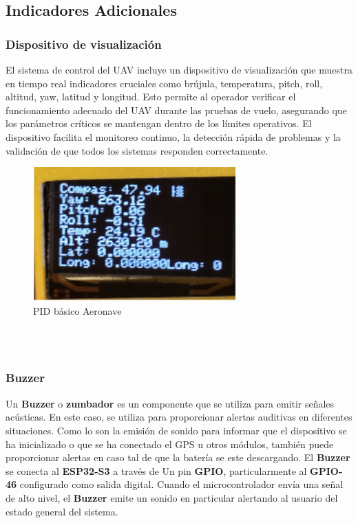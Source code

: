\subsection{Indicadores Adicionales}
\subsubsection{Dispositivo de visualización}
El sistema de control del UAV incluye un dispositivo de visualización que muestra en tiempo real indicadores cruciales como brújula, temperatura, pitch, roll, altitud, yaw, latitud y longitud. Esto permite al operador verificar el funcionamiento adecuado del UAV durante las pruebas de vuelo, asegurando que los parámetros críticos se mantengan dentro de los límites operativos. El dispositivo facilita el monitoreo continuo, la detección rápida de problemas y la validación de que todos los sistemas responden correctamente.
\begin{figure}[H]
    \centering
    \includegraphics[width=\textwidth]{Imagenes/Firmware/Pantalla oled.png}
    \caption{PID básico Aeronave }
    \label{fig:mov-Superficies }
\end{figure} \\ \\


\subsubsection{Buzzer}

Un \textbf{Buzzer} o \textbf{zumbador} es un componente que se utiliza para emitir señales acústicas. En este caso, se utiliza para proporcionar alertas auditivas en diferentes situaciones. Como lo son la emisión de sonido para informar que el dispositivo se ha inicializado o que se ha conectado el GPS u otros módulos, también puede proporcionar alertas en caso tal de que la batería se este descargando.
\vspace{5 px}
El \textbf{Buzzer} se conecta al \textbf{ESP32-S3} a través de Un pin \textbf{GPIO}, particularmente al \textbf{GPIO-46}  configurado como salida digital. Cuando el microcontrolador envía una señal de alto nivel, el \textbf{Buzzer} emite un sonido en particular alertando al usuario del estado general del sistema.
\vspace{5 px}





